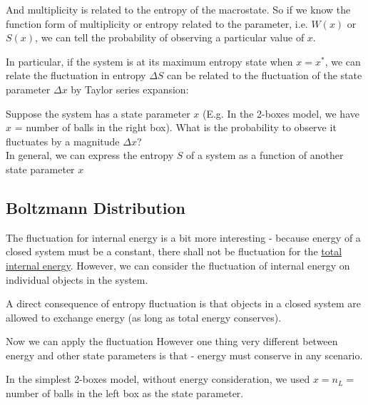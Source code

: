 \documentclass[class=article, crop=false, 12pt]{standalone}
\begin{document}
And multiplicity is related to the entropy of the macrostate. 
So if we know the function form of multiplicity or entropy related to the parameter, i.e. $W(x)$ or $S(x)$,
we can tell the probability of observing a particular value of $x$.

In particular, if the system is at its maximum entropy state when $x=x^\ast$,
we can relate the fluctuation in entropy $\Delta S$ can be related to 
the fluctuation of the state parameter $\Delta x$ by Taylor series expansion:


Suppose the system has a state parameter $x$ 
(E.g. In the 2-boxes model, we have $x$ = number of balls in the right box).
What is the probability to observe it fluctuates by a magnitude $\Delta x$?\\



In general, we can express the entropy $S$ of a system as a function of another state parameter $x$ 




\subsection{Boltzmann Distribution}

The fluctuation for internal energy is a bit more interesting - 
because energy of a closed system must be a constant, 
there shall not be fluctuation for the \ul{total internal energy}.
However, we can consider the fluctuation of internal energy on individual objects in the system.


A direct consequence of entropy fluctuation is that objects in a closed system are allowed to exchange energy
(as long as total energy conserves).



Now we can apply the fluctuation 
However one thing very different between energy and other state parameters is that -
energy must conserve in any scenario. 






In the simplest 2-boxes model, without energy consideration,
we used $x=n_L=$ number of balls in the left box as the state parameter. 
\end{document}
